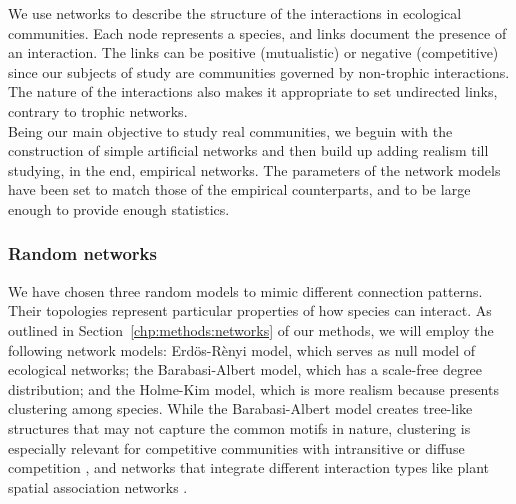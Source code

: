 We use networks to describe the structure of the interactions in ecological communities. Each node represents a species, and links document the presence of an interaction. The links can be positive (mutualistic) or negative (competitive) since our subjects of study are communities governed by non-trophic interactions. The nature of the interactions also makes it appropriate to set undirected links, contrary to trophic networks.\\

 Being our main objective to study real communities, we beguin with the construction of simple artificial networks and then build up adding realism till studying, in the end, empirical networks. The parameters of the network models have been set to match those of the empirical counterparts, and to be large enough to provide enough statistics. 

\subsubsection{Random networks}
We have chosen three random models to mimic different connection patterns. Their topologies represent particular properties of how species can interact. As outlined in Section~\ref{chp:methods:networks} of our methods, we will employ the following network models: Erdös-Rènyi model, which serves as null model of ecological networks; the Barabasi-Albert model, which has a scale-free degree distribution; and the Holme-Kim model, which is more realism because presents clustering among species. While the Barabasi-Albert model creates tree-like structures that may not capture the common motifs in nature,  clustering is especially relevant for competitive communities with intransitive or diffuse competition  \cite{godoy2017intransitivity,losapio2019perspectives}, and networks that integrate different interaction types \cite{kefi2016structured} like plant spatial association networks \cite{Saiz2017EvidenceNetworks}.

